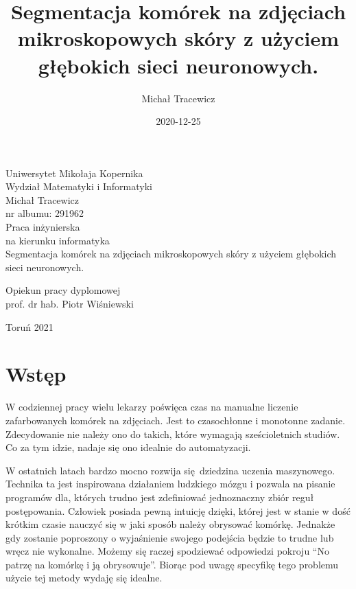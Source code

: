 \documentclass{article}
\title{Segmentacja komórek na zdjęciach mikroskopowych skóry z użyciem głębokich sieci neuronowych.}
\date{2020-12-25}
\author{Michał Tracewicz}
\begin{document}
\begin{titlepage}
    \begin{center}
        {\large Uniwersytet Mikołaja Kopernika\\}
        {\large Wydział Matematyki i Informatyki\\}
        \vspace{2.1cm}
        {\large Michał Tracewicz\\}
        nr albumu: 291962\\
        \vspace{2cm}
        Praca inżynierska\\
        na kierunku informatyka\\
        \vspace{2cm}
        {\huge Segmentacja komórek na zdjęciach mikroskopowych skóry z użyciem głębokich sieci neuronowych.\\}
    \end{center}
    \hfill
    \begin{minipage}{6cm}
        \vspace{12mm}
        {
            Opiekun pracy dyplomowej\\
            prof. dr hab. Piotr Wiśniewski
        }
    \end{minipage}
    \vspace{2cm}
    \begin{center}
        {Toruń 2021\\}
    \end{center}
    \vspace{1.2cm}
\end{titlepage}
\newpage
\tableofcontents
\newpage
\section{Wstęp}
W codziennej pracy wielu lekarzy poświęca czas na manualne liczenie zafarbowanych komórek na zdjęciach.
Jest to czasochłonne i monotonne zadanie.
Zdecydowanie nie należy ono do takich, które wymagają sześcioletnich studiów.
Co za tym idzie, nadaje się ono idealnie do automatyzacji.

W ostatnich latach bardzo mocno rozwija się dziedzina uczenia maszynowego.
Technika ta jest inspirowana działaniem ludzkiego mózgu i pozwala na pisanie programów dla, których trudno jest zdefiniować jednoznaczny zbiór reguł postępowania.
Człowiek posiada pewną intuicję dzięki, której jest w stanie w dość krótkim czasie nauczyć się w jaki sposób należy obrysować komórkę.
Jednakże gdy zostanie poproszony o wyjaśnienie swojego podejścia będzie to trudne lub wręcz nie wykonalne.
Możemy się raczej spodziewać odpowiedzi pokroju ``No patrzę na komórkę i ją obrysowuje''.
Biorąc pod uwagę specyfikę tego problemu użycie tej metody wydaję się idealne.
\end{document}
